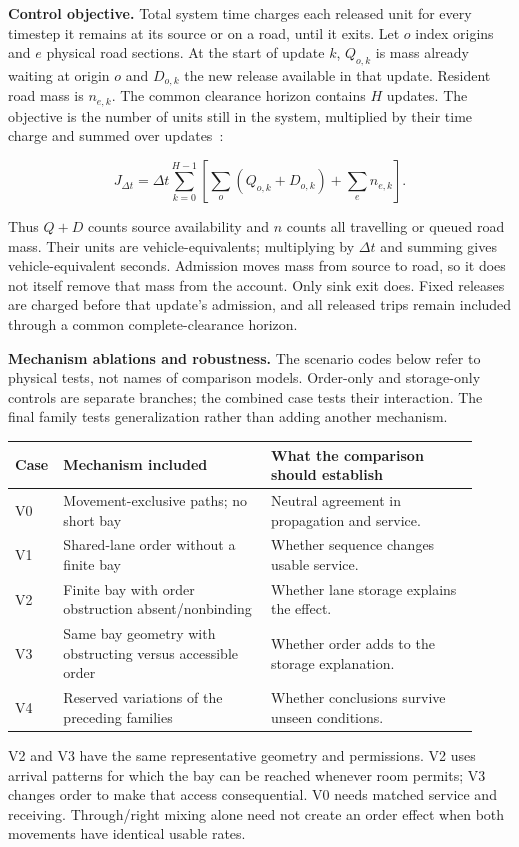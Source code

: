 \documentclass[10pt,a4paper]{article}
\begin{document}
\textbf{Control objective.} Total system time charges each released unit
for every timestep it remains at its source or on a road, until it exits.
Let $o$ index origins and $e$ physical road sections. At the start of
update $k$, $Q_{o,k}$ is mass already waiting at origin $o$ and
$D_{o,k}$ the new release available in that update. Resident road mass is
$n_{e,k}$. The common clearance horizon contains $H$ updates. The objective
is the number of units still in the system, multiplied by their time
charge and summed over updates~\cite{m0}:
\par
\begin{equation}
 J_{\Delta t}
 =\Delta t\sum_{k=0}^{H-1}
 \left[\sum_o(Q_{o,k}+D_{o,k})+\sum_en_{e,k}\right].
 \label{eq:compact-tst}
\end{equation}

Thus $Q+D$ counts source availability and $n$ counts all travelling or
queued road mass. Their units are vehicle-equivalents; multiplying by
$\Delta t$ and summing gives vehicle-equivalent seconds. Admission moves
mass from source to road, so it does not itself remove that mass from
the account. Only sink exit does. Fixed releases are charged before
that update's admission, and all released trips remain included through
a common complete-clearance horizon.

\textbf{Mechanism ablations and robustness.} The scenario codes below
refer to physical tests, not names of comparison models. Order-only and
storage-only controls are separate branches; the combined case tests
their interaction. The final family tests generalization rather than
adding another mechanism.
\begin{center}
\setlength{\tabcolsep}{4pt}
\begin{tabular}{@{}>{\raggedright\arraybackslash}p{0.06\linewidth}>{\raggedright\arraybackslash}p{0.43\linewidth}>{\raggedright\arraybackslash}p{0.43\linewidth}@{}}
\toprule
Case & Mechanism included & What the comparison should establish\\
\midrule
V0 & Movement-exclusive paths; no short bay & Neutral agreement in propagation and service.\\
V1 & Shared-lane order without a finite bay & Whether sequence changes usable service.\\
V2 & Finite bay with order obstruction absent/nonbinding & Whether lane storage explains the effect.\\
V3 & Same bay geometry with obstructing versus accessible order & Whether order adds to the storage explanation.\\
V4 & Reserved variations of the preceding families & Whether conclusions survive unseen conditions.\\
\bottomrule
\end{tabular}
\end{center}
V2 and V3 have the same representative geometry and permissions.
V2 uses arrival patterns for which the bay can be reached whenever room
permits; V3 changes order to make that access consequential. V0 needs
matched service and receiving. Through/right mixing alone need not create
an order effect when both movements have identical usable rates.
\end{document}
